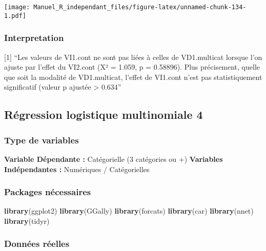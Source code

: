 \documentclass[
]{book}
\newenvironment{Shaded}{\begin{snugshade}}{\end{snugshade}}
\newcommand{\KeywordTok}[1]{\textcolor[rgb]{0.13,0.29,0.53}{\textbf{#1}}}
\newcommand{\NormalTok}[1]{#1}
\begin{document}
\texttt{[image: Manuel\_R\_independant\_files/figure-latex/unnamed-chunk-134-1.pdf]}

\hypertarget{interpretation-15}{%
\subsubsection{Interpretation}\label{interpretation-15}}

{[}1{]} ``Les valeurs de VI1.cont ne sont pas liées à celles de VD1.multicat lorsque l'on ajuste par l'effet du VI2.cont (X² = 1.059, p = 0.58896). Plus précisement, quelle que soit la modalité de VD1.multicat, l'effet de VI1.cont n'est pas statistiquement significatif (valeur p ajustée \textgreater{} 0.634''

\hypertarget{ruxe9gression-logistique-multinomiale-4}{%
\subsection{Régression logistique multinomiale 4}\label{ruxe9gression-logistique-multinomiale-4}}

\hypertarget{type-de-variables-16}{%
\subsubsection{Type de variables}\label{type-de-variables-16}}

\textbf{Variable Dépendante :} Catégorielle (3 catégories ou +)
\textbf{Variables Indépendantes :} Numériques / Catégorielles

\hypertarget{packages-nuxe9cessaires-16}{%
\subsubsection{Packages nécessaires}\label{packages-nuxe9cessaires-16}}

\begin{Shaded}
\begin{Highlighting}[]
\KeywordTok{library}\NormalTok{(ggplot2)}
\KeywordTok{library}\NormalTok{(GGally)}
\KeywordTok{library}\NormalTok{(forcats)}
\KeywordTok{library}\NormalTok{(car)}
\KeywordTok{library}\NormalTok{(nnet)}
\KeywordTok{library}\NormalTok{(tidyr)}
\end{Highlighting}
\end{Shaded}

\hypertarget{donnuxe9es-ruxe9elles-16}{%
\subsubsection{Données réelles}\label{donnuxe9es-ruxe9elles-16}}
\end{document}
